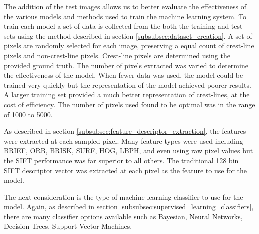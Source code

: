 The addition of the test images allows us to better evaluate the effectiveness of the various models and methods used to train the machine learning system. To train each model a set of data is collected from the both the training and test sets using the method described in section \ref{subsubsec:dataset_creation}. A set of pixels are randomly selected for each image, preserving a equal count of crest-line pixels and non-crest-line pixels. Crest-line pixels are determined using the provided ground truth. The number of pixels extracted was varied to determine the effectiveness of the model. When fewer data was used, the model could be trained very quickly but the representation of the model achieved poorer results. A larger training set provided a much better representation of crest-lines, at the cost of efficiency. The number of pixels used found to be optimal was in the range of 1000 to 5000.

As described in section \ref{subsubsec:feature_descriptor_extraction}, the features were extracted at each sampled pixel. Many feature types were used including BRIEF, ORB, BRISK, SURF, HOG, LBPH, and even using raw pixel values but the SIFT performance was far superior to all others. The traditional 128 bin SIFT descriptor vector was extracted at each pixel as the feature to use for the model.

The next consideration is the type of machine learning classifier to use for the model. Again, as described in section \ref{subsubsec:supervised_learning_classifiers}, there are many classifier options available such as Bayesian, Neural Networks, Decision Trees, Support Vector Machines.

